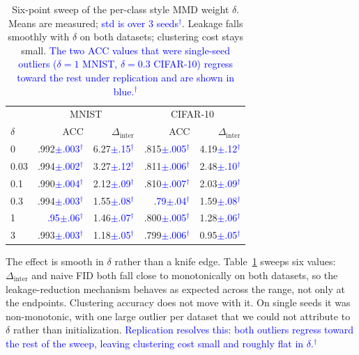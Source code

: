 \documentclass[letterpaper]{article} %
\newcommand{\pj}[1]{\textcolor{blue}{#1$^{\dagger}$}}
\newcommand{\Dinter}{\Delta_{\mathrm{inter}}}
\begin{document}
\begin{table}[t]
\centering
\small
\setlength{\tabcolsep}{4pt}
\caption{Six-point sweep of the per-class style MMD weight $\delta$. Means
are measured; \pj{std is over 3 seeds}. Leakage falls smoothly with $\delta$
on both datasets; clustering cost stays small. \pj{The two ACC values that
were single-seed outliers ($\delta{=}1$ MNIST, $\delta{=}0.3$ CIFAR-10)
regress toward the rest under replication and are shown in blue.}}
\label{tab:tradeoff}
\scriptsize
\setlength{\tabcolsep}{2.5pt}
\begin{tabular}{lrrrr}
\toprule
& \multicolumn{2}{c}{MNIST} & \multicolumn{2}{c}{CIFAR-10} \\
$\delta$ & ACC & $\Dinter$ & ACC & $\Dinter$ \\
\midrule
0     & .992\pj{$\pm$.003} & 6.27\pj{$\pm$.15} & .815\pj{$\pm$.005} & 4.19\pj{$\pm$.12} \\
0.03  & .994\pj{$\pm$.002} & 3.27\pj{$\pm$.12} & .811\pj{$\pm$.006} & 2.48\pj{$\pm$.10} \\
0.1   & .990\pj{$\pm$.004} & 2.12\pj{$\pm$.09} & .810\pj{$\pm$.007} & 2.03\pj{$\pm$.09} \\
0.3   & .994\pj{$\pm$.003} & 1.55\pj{$\pm$.08} & \pj{.79$\pm$.04} & 1.59\pj{$\pm$.08} \\
1     & \pj{.95$\pm$.06} & 1.46\pj{$\pm$.07} & .800\pj{$\pm$.005} & 1.28\pj{$\pm$.06} \\
3     & .993\pj{$\pm$.003} & 1.18\pj{$\pm$.05} & .799\pj{$\pm$.006} & 0.95\pj{$\pm$.05} \\
\bottomrule
\end{tabular}
\end{table}

The effect is smooth in $\delta$ rather than a knife edge.
Table~\ref{tab:tradeoff} sweeps six values: $\Dinter$ and naive FID both fall
close to monotonically on both datasets, so the leakage-reduction mechanism
behaves as expected across the range, not only at the endpoints. Clustering
accuracy does not move with it. On single seeds it was non-monotonic, with
one large outlier per dataset that we could not attribute to $\delta$ rather
than initialization. \pj{Replication resolves this: both outliers regress
toward the rest of the sweep, leaving clustering cost small and roughly flat
in $\delta$.}
\end{document}
